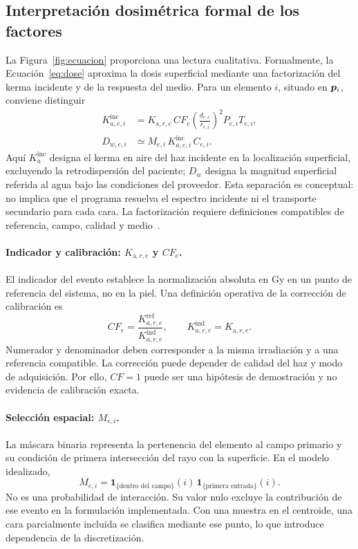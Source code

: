 \subsection{Interpretación dosimétrica formal de los factores}
\label{sec:factores-formal}
La Figura~\ref{fig:ecuacion} proporciona una lectura cualitativa. Formalmente, la Ecuación~\eqref{eq:dose} aproxima la dosis superficial mediante una factorización del kerma incidente y de la respuesta del medio. Para un elemento $i$, situado en $\bm{p}_i$, conviene distinguir
\begin{align}
K^{\mathrm{inc}}_{a,e,i}&=K_{\mathrm a,r,e}\,CF_e
\left(\frac{d_{r,e}}{r_{e,i}}\right)^2P_{e,i}T_{e,i},\label{eq:kerma-local-formal}\\
D_{w,e,i}&\simeq M_{e,i}\,K^{\mathrm{inc}}_{a,e,i}\,C_{e,i}.
\label{eq:dosis-local-formal}
\end{align}
Aquí $K^{\mathrm{inc}}_a$ designa el kerma en aire del haz incidente en la localización superficial, excluyendo la retrodispersión del paciente; $D_w$ designa la magnitud superficial referida al agua bajo las condiciones del proveedor. Esta separación es conceptual: no implica que el programa resuelva el espectro incidente ni el transporte secundario para cada cara. La factorización requiere definiciones compatibles de referencia, campo, calidad y medio~\citep{aapm2021,benreport}.

\paragraph{Indicador y calibración: $K_{\mathrm a,r,e}$ y $CF_e$.}
El indicador del evento establece la normalización absoluta en Gy en un punto de referencia del sistema, no en la piel. Una definición operativa de la corrección de calibración es
\begin{equation}
CF_e=\frac{K^{\mathrm{ref}}_{a,r,e}}{K^{\mathrm{ind}}_{a,r,e}},
\qquad K^{\mathrm{ind}}_{a,r,e}=K_{\mathrm a,r,e}.
\end{equation}
Numerador y denominador deben corresponder a la misma irradiación y a una referencia compatible. La corrección puede depender de calidad del haz y modo de adquisición. Por ello, $CF=1$ puede ser una hipótesis de demostración y no evidencia de calibración exacta.

\paragraph{Selección espacial: $M_{e,i}$.}
La máscara binaria representa la pertenencia del elemento al campo primario y su condición de primera intersección del rayo con la superficie. En el modelo idealizado,
\begin{equation}
M_{e,i}=\mathbf 1_{\{\text{dentro del campo}\}}(i)\,
\mathbf 1_{\{\text{primera entrada}\}}(i).
\end{equation}
No es una probabilidad de interacción. Su valor nulo excluye la contribución de ese evento en la formulación implementada. Con una muestra en el centroide, una cara parcialmente incluida se clasifica mediante ese punto, lo que introduce dependencia de la discretización.

